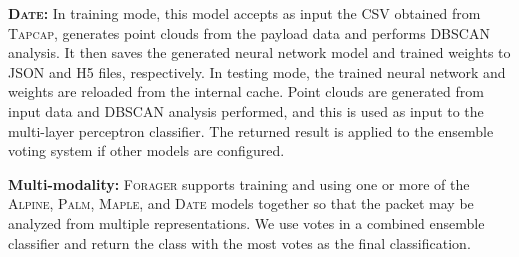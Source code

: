 \textbf{\textsc{Date}: } In training mode, this model accepts as input the CSV obtained from \textsc{Tapcap}, generates point clouds from the payload data and performs DBSCAN analysis. It then saves the generated neural network model and trained weights to JSON and H5 files, respectively. In testing mode, the trained neural network and weights are reloaded from the internal cache. Point clouds are generated from input data and DBSCAN analysis performed, and this is used as input to the multi-layer perceptron classifier. The returned result is applied to the ensemble voting system if other models are configured.

\textbf{Multi-modality: } \textsc{Forager} supports training and using one or more of the \textsc{Alpine}, \textsc{Palm}, \textsc{Maple}, and \textsc{Date} models together so that the packet may be analyzed from multiple representations. We use votes in a combined ensemble classifier and return the class with the most votes as the final classification.
